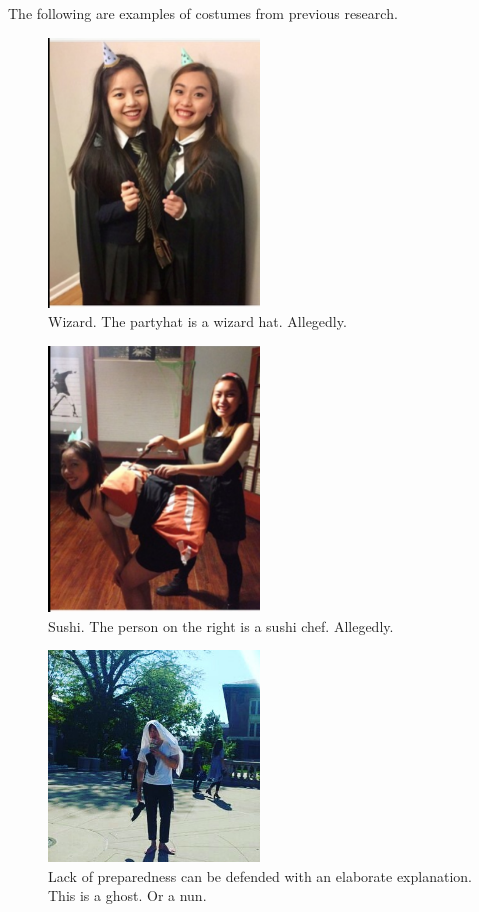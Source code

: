 \documentclass[12pt,letterpaper]{article}
\begin{document}
The following are examples of costumes from
previous research.
\begin{figure}
\centering
\caption{Wizard. The partyhat is a wizard hat. Allegedly.}
\includegraphics[width=0.5\textwidth]{wiz.png}
\end{figure}
\begin{figure}
\centering
\caption{Sushi. The person on the right is a sushi chef. Allegedly.}
\includegraphics[width=0.5\textwidth]{sus.png}
\end{figure}
\begin{figure}
\centering
\caption{Lack of preparedness can be defended with an elaborate explanation. This is a ghost. Or a nun.}
\includegraphics[width=0.5\textwidth]{ghost.jpg}
\end{figure}
\end{document}
